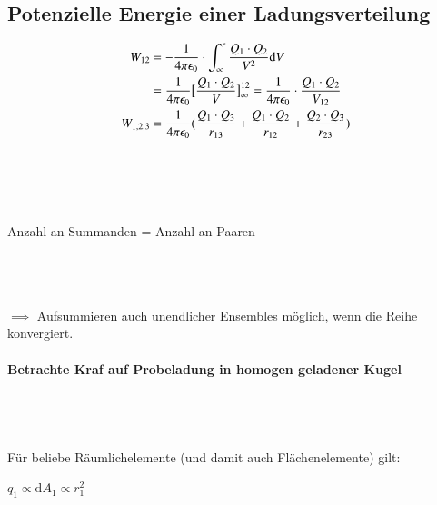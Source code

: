 \documentclass[11pt]{article}
\begin{document}
\subsection{Potenzielle Energie einer Ladungsverteilung}

\begin{align*}
\displaystyle W_{12} &= -\frac{1}{4\pi\epsilon_0}\cdot\int_{\infty}^{r} \frac{Q_1\cdot Q_2}{V^2}  \mathrm{d}V\\
&=\frac{1}{4\pi\epsilon_0} \big[\frac{Q_1\cdot Q_2}{V}\big]^{12}_\infty = \frac{1}{4\pi\epsilon_0}\cdot \frac{Q_1\cdot Q_2}{V_{12}}
\hfill\\
W_{1,2,3} &= \frac{1}{4\pi\epsilon_0}(\frac{Q_1\cdot Q_3}{r_{13}}+\frac{Q_1\cdot Q_2}{r_{12}}+\frac{Q_2\cdot Q_3}{r_{23}})
\end{align*}

\newline\\
\newline\\
\linebreak\\
\hfill\\
Anzahl an Summanden = Anzahl an Paaren
\newline\\


\newline\\
\linebreak\\
\hfill\\

$\implies$ Aufsummieren auch unendlicher Ensembles möglich, wenn die Reihe konvergiert. 

\paragraph{Betrachte Kraf auf Probeladung in homogen geladener Kugel}

\newline\\
\linebreak\\
\hfill\\

Für beliebe Räumlichelemente (und damit auch Flächenelemente) gilt:

$q_1 \propto \mathrm{d}A_1 \propto r_1^2$
\end{document}
